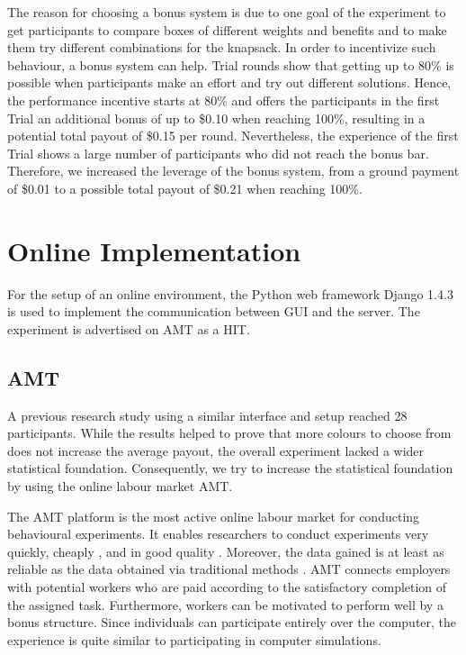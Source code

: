 The reason for choosing a bonus system is due to one goal of the experiment to get participants to compare boxes of different weights and benefits and to make  them try different combinations for the knapsack.
In order to incentivize such behaviour, a bonus system can help. Trial rounds show that getting up to 80\% is possible when participants make an effort and try out different solutions. Hence, the performance incentive starts at 80\% and offers the participants in the first Trial an additional bonus of up to \$0.10 when reaching 100\%, resulting in a potential total payout of \$0.15 per round. Nevertheless, the experience of the first Trial shows a large number of participants who did not reach the bonus bar. Therefore, we increased the leverage of the bonus system, from a ground payment of \$0.01 to a possible total payout of \$0.21 when reaching 100\%.

\section{Online Implementation}
\label{ch:Experiment:sec:OnlineImplementation}

For the setup of an online environment, the Python web framework Django 1.4.3 is used to implement the communication between \ac{GUI} and the server.
The experiment is advertised on \acf{AMT} as a \ac{HIT}.

\subsection{\acl{AMT}}
\label{ch:Experiment:sec:OnlineImplementation:subsec:AMT}
A previous research study\citep{Schmidt2012} using a similar interface and setup reached 28 participants. While the results helped to prove that more colours to choose from does not increase the average payout, the overall experiment lacked a wider statistical foundation.
Consequently, we try to increase the statistical foundation by using the online labour market \acf{AMT}.

The \ac{AMT} platform is the most active online labour market for conducting behavioural experiments. It enables researchers to conduct experiments very quickly, cheaply \citep{Rand2012}, and in good quality \citep{Gardner2012}. Moreover, the data gained is at least as reliable as the data obtained via traditional methods \citep{Buhrmester2011}. \ac{AMT} connects employers with potential workers who are paid according to the satisfactory completion of the assigned task. Furthermore, workers can be motivated to perform well by a bonus structure. Since individuals can participate entirely over the computer, the experience is quite similar to participating in computer simulations.

